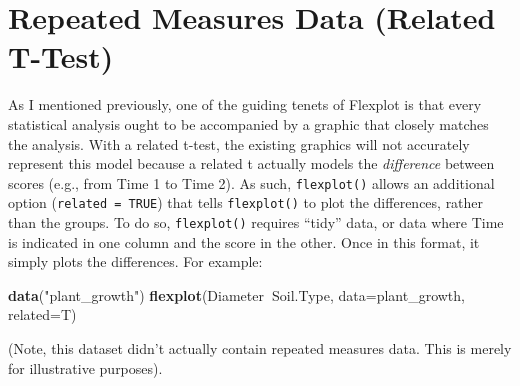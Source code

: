 \documentclass[,]{book}
\newenvironment{Shaded}{\begin{snugshade}}{\end{snugshade}}
\newcommand{\KeywordTok}[1]{\textcolor[rgb]{0.13,0.29,0.53}{\textbf{#1}}}
\newcommand{\DataTypeTok}[1]{\textcolor[rgb]{0.13,0.29,0.53}{#1}}
\newcommand{\DecValTok}[1]{\textcolor[rgb]{0.00,0.00,0.81}{#1}}
\newcommand{\StringTok}[1]{\textcolor[rgb]{0.31,0.60,0.02}{#1}}
\newcommand{\OperatorTok}[1]{\textcolor[rgb]{0.81,0.36,0.00}{\textbf{#1}}}
\newcommand{\NormalTok}[1]{#1}
\begin{document}
\begin{Shaded}
\end{Shaded}

\section*{Repeated Measures Data (Related
T-Test)}\label{repeated-measures-data-related-t-test}

As I mentioned previously, one of the guiding tenets of Flexplot is that
every statistical analysis ought to be accompanied by a graphic that
closely matches the analysis. With a related t-test, the existing
graphics will not accurately represent this model because a related t
actually models the \emph{difference} between scores (e.g., from Time 1
to Time 2). As such, \texttt{flexplot()} allows an additional option
(\texttt{related\ =\ TRUE}) that tells \texttt{flexplot()} to plot the
differences, rather than the groups. To do so, \texttt{flexplot()}
requires ``tidy'' data, or data where Time is indicated in one column
and the score in the other. Once in this format, it simply plots the
differences. For example:

\begin{Shaded}
\begin{Highlighting}[]
\KeywordTok{data}\NormalTok{(}\StringTok{"plant_growth"}\NormalTok{)}
\KeywordTok{flexplot}\NormalTok{(Diameter}\OperatorTok{~}\NormalTok{Soil.Type, }\DataTypeTok{data=}\NormalTok{plant_growth, }\DataTypeTok{related=}\NormalTok{T)}
\end{Highlighting}
\end{Shaded}

\noindent (Note, this dataset didn't actually contain repeated measures
data. This is merely for illustrative purposes).
\end{document}

